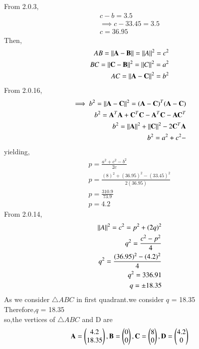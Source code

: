 \documentclass[journal,12pt,twocolumn]{IEEEtran}
\begin{document}
From 2.0.3,
\begin{align}
c-b=3.5
\\
\implies c - 33.45=3.5
\\
c=36.95
\end{align}
Then,
\begin{align}
AB = \left\lVert\mathbf{A}-\mathbf{B}\right\rVert = \left\lVert A\right\rVert^2=c^2
\\
BC = \left\lVert\mathbf{C}-\mathbf{B}\right\rVert^2 = \left\lVert C\right\rVert^2= a^2
\\
AC = \left\lVert\mathbf{A}-\mathbf{C}\right\rVert^2 = b^2
\end{align}
From 2.0.16,
\begin{align}
\implies b^2=\left\lVert\mathbf{A}-\mathbf{C}\right\rVert^2=({\mathbf{A}-\mathbf{C}})^T ({\mathbf{A}-\mathbf{C}})
\\
b^2= \mathbf{A}^T\mathbf{A}+\mathbf{C}^T\mathbf{C}-\mathbf{A}^T\mathbf{C} - \mathbf{A}\mathbf{C}^T
\\
b^2= \left\lVert\mathbf{A}\right\rVert^2 + \left\lVert\mathbf{C}\right\rVert^2 - 2\mathbf{C}^T\mathbf{A} 
\\
b^2= a^2 + c^2 - 
\end{align}
yielding,
\begin{align}
p=\frac{a^2 + c^2 - b^2}{2c}
\\
p=\frac{(8)^2 + (36.95)^2 - (33.45)^2}{2(36.95)}
\\
p=\frac{310.9}{73.9}
\\
p=4.2
\end{align}
From 2.0.14,
\begin{align}
\left\lVert A\right\rVert^2=c^2=p^2 +  (2q)^2
\\
q^2=\frac{c^2 - p^2}{4}
\\
q^2= \frac{(36.95)^2 - (4.2)^2}{4}
\\
q^2= 336.91
\\
q= \pm 18.35 
\end{align}
As we consider $\triangle ABC$ in first quadrant.we consider $q$ = 18.35
\\
Therefore,$q$ = 18.35
\\
so,the vertices of $\triangle ABC$ and D are
\begin{align}
\mathbf{A} = \begin{pmatrix}4.2\\18.35\end{pmatrix}, \mathbf{B} = \begin{pmatrix}0\\0\end{pmatrix}, \mathbf{C} = \begin{pmatrix}8\\0\end{pmatrix},\mathbf{D} = \begin{pmatrix}4.2\\0\end{pmatrix}
\end{align}

\end{document}
